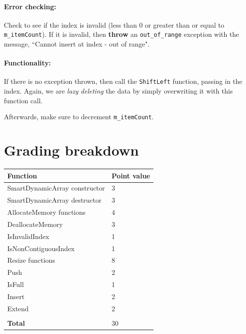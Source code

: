 \documentclass[a4paper,12pt]{book}
\begin{document}
    \paragraph{Error checking:}
    Check to see if the index is invalid (less than 0 or greater than
    or equal to \texttt{m\_itemCount}). If it is invalid, then
    \textbf{throw} an \texttt{out\_of\_range} exception
    with the message, ``Cannot insert at index - out of range".

    \paragraph{Functionality:}
    If there is no exception thrown, then call the \texttt{ShiftLeft}
    function, passing in the index. Again, we are \textit{lazy deleting}
    the data by simply overwriting it with this function call.

    Afterwards, make sure to decrement \texttt{m\_itemCount}.



\newpage
\section*{Grading breakdown}

\begin{tabular}{ | p{8cm} | p{4cm} | }
    \hline
    \textbf{Function} & \textbf{Point value}
    \\ \hline

    SmartDynamicArray constructor       & 3
    \\ \hline
    SmartDynamicArray destructor        & 3
    \\ \hline

    AllocateMemory functions            & 4
    \\ \hline
    DeallocateMemory                    & 3
    \\ \hline

    IsInvalidIndex                      & 1
    \\ \hline
    IsNonContiguousIndex                & 1
    \\ \hline

    Resize functions                    & 8
    \\ \hline


    Push                                & 2
    \\ \hline
    IsFull                              & 1
    \\ \hline
    Insert                              & 2
    \\ \hline
    Extend                              & 2
    \\ \hline

    
    
    & \\ \hline
    \textbf{Total} & 30
    \\ \hline
\end{tabular}
\end{document}

